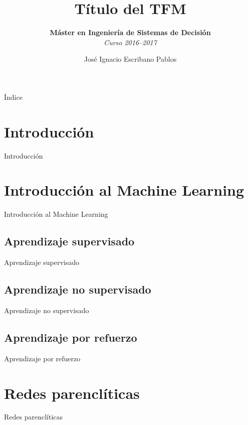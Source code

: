 \documentclass{beamer}
\title{Título del TFM}
\subtitle{\textbf{Máster en Ingeniería de Sistemas de Decisión} \\ \textit{Curso 2016--2017}}
\author{José Ignacio Escribano Pablos}
\institute{Ana Elizabeth García Sipols \\ Miguel Romance del Río}
\begin{document}
\setcounter{showProgressBar}{0}
\setcounter{showSlideNumbers}{0}

\frame{\titlepage}

\begin{frame}{Índice}
	\tableofcontents
\end{frame}

\setcounter{framenumber}{0}
\setcounter{showProgressBar}{1}
\setcounter{showSlideNumbers}{1}
\section{Introducción}
\begin{frame}{Introducción}
	
\end{frame}

\section{Introducción al Machine Learning}
\begin{frame}{Introducción al Machine Learning}

\end{frame}

\subsection{Aprendizaje supervisado}
\begin{frame}{Aprendizaje supervisado}
	
\end{frame}

\subsection{Aprendizaje no supervisado}
\begin{frame}{Aprendizaje no supervisado}
	
\end{frame}

\subsection{Aprendizaje por refuerzo}
\begin{frame}{Aprendizaje por refuerzo}
	
\end{frame}

\section{Redes parenclíticas}
\begin{frame}{Redes parenclíticas}
	
\end{frame}
\end{document}
